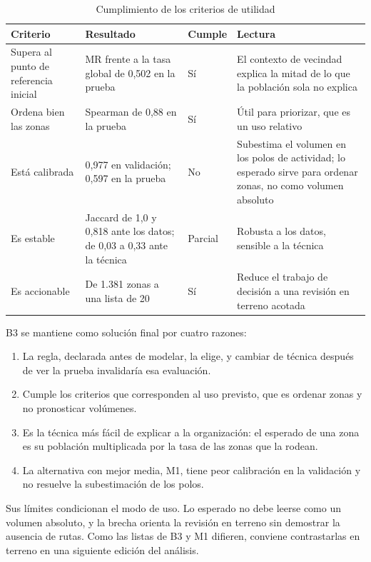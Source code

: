 \begin{table}[H]
  \centering
  \caption{Cumplimiento de los criterios de utilidad}
  \label{tab:cumplimiento-criterios}
  \interlineadoSimple
  \small
  \begin{tabularx}{\textwidth}{@{}L{0.23\textwidth}L{0.30\textwidth}L{0.11\textwidth}Y@{}}
    \toprule
    \textbf{Criterio} & \textbf{Resultado} & \textbf{Cumple} & \textbf{Lectura} \\
    \midrule
    Supera al punto de referencia inicial & MR frente a la tasa global de 0,502 en la prueba & Sí & El contexto de vecindad explica la mitad de lo que la población sola no explica \\
    Ordena bien las zonas & Spearman de 0,88 en la prueba & Sí & Útil para priorizar, que es un uso relativo \\
    Está calibrada & 0,977 en validación; 0,597 en la prueba & No & Subestima el volumen en los polos de actividad; lo esperado sirve para ordenar zonas, no como volumen absoluto \\
    Es estable & Jaccard de 1,0 y 0,818 ante los datos; de 0,03 a 0,33 ante la técnica & Parcial & Robusta a los datos, sensible a la técnica \\
    Es accionable & De 1.381 zonas a una lista de 20 & Sí & Reduce el trabajo de decisión a una revisión en terreno acotada \\
    \bottomrule
  \end{tabularx}
\end{table}

B3 se mantiene como solución final por cuatro razones:
\begin{enumerate}
  \item La regla, declarada antes de modelar, la elige, y cambiar de técnica después de ver
        la prueba invalidaría esa evaluación.
  \item Cumple los criterios que corresponden al uso previsto, que es ordenar zonas y no
        pronosticar volúmenes.
  \item Es la técnica más fácil de explicar a la organización: el esperado de una zona es
        su población multiplicada por la tasa de las zonas que la rodean.
  \item La alternativa con mejor media, M1, tiene peor calibración en la validación y no
        resuelve la subestimación de los polos.
\end{enumerate}

Sus límites condicionan el modo de uso. Lo esperado no debe leerse como un volumen
absoluto, y la brecha orienta la revisión en terreno sin demostrar la ausencia de rutas.
Como las listas de B3 y M1 difieren, conviene contrastarlas en terreno en una siguiente
edición del análisis.

